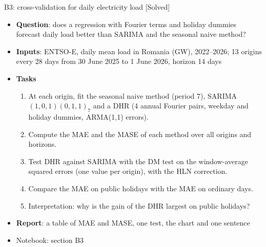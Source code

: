 \begin{frame}{B3: cross-validation for daily electricity load [Solved]}
\itemsize{\footnotesize}
\begin{itemize}
\item \textbf{Question}: does a regression with Fourier terms and holiday dummies forecast daily load better than SARIMA and the seasonal naive method?
\item \textbf{Inputs}: ENTSO-E, daily mean load in Romania (GW), 2022--2026; 13 origins every 28 days from 30 June 2025 to 1 June 2026, horizon 14 days
\item \textbf{Tasks}
\begin{enumerate}
    \item At each origin, fit the seasonal naive method (period 7), SARIMA$(1,0,1)(0,1,1)_7$ and a DHR (4 annual Fourier pairs, weekday and holiday dummies, ARMA(1,1) errors).
    \item Compute the MAE and the MASE of each method over all origins and horizons.
    \item Test DHR against SARIMA with the DM test on the window-average squared errors (one value per origin), with the HLN correction.
    \item Compare the MAE on public holidays with the MAE on ordinary days.
    \item Interpretation: why is the gain of the DHR largest on public holidays?
\end{enumerate}
\item \textbf{Report}: a table of MAE and MASE, one test, the chart and one sentence
\item Notebook: section B3
\end{itemize}
\end{frame}

